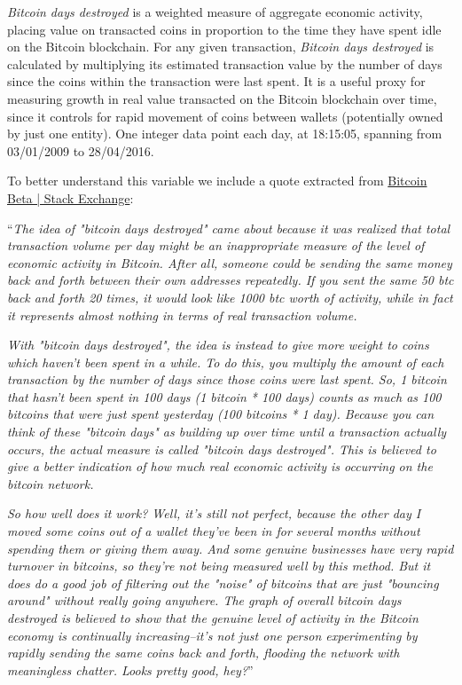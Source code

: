 \textit{Bitcoin days destroyed} is a weighted measure of aggregate
economic activity, placing value on transacted coins in proportion to
the time they have spent idle on the Bitcoin blockchain. For any given
transaction, \textit{Bitcoin days destroyed} is calculated by
multiplying its estimated transaction value by the number of days
since the coins within the transaction were last spent. It is a useful
proxy for measuring growth in real value transacted on the Bitcoin
blockchain over time, since it controls for rapid movement of coins
between wallets (potentially owned by just one entity). One integer
data point each day, at 18:15:05, spanning from 03/01/2009 to
28/04/2016.

To better understand this variable we include a quote extracted from
\href{http://bitcoin.stackexchange.com/questions/845/what-are-bitcoin-days-destroyed}{Bitcoin
Beta | Stack Exchange}:

``\textit{The idea of "bitcoin days destroyed" came about because it
was realized that total transaction volume per day might be an
inappropriate measure of the level of economic activity in Bitcoin.
After all, someone could be sending the same money back and forth
between their own addresses repeatedly. If you sent the same 50 btc
back and forth 20 times, it would look like 1000 btc worth of
activity, while in fact it represents almost nothing in terms of real
transaction volume.}

\textit{With "bitcoin days destroyed", the idea is instead to give
more weight to coins which haven't been spent in a while. To do this,
you multiply the amount of each transaction by the number of days
since those coins were last spent. So, 1 bitcoin that hasn't been
spent in 100 days (1 bitcoin * 100 days) counts as much as 100
bitcoins that were just spent yesterday (100 bitcoins * 1 day).
Because you can think of these "bitcoin days" as building up over time
until a transaction actually occurs, the actual measure is called
"bitcoin days destroyed". This is believed to give a better indication
of how much real economic activity is occurring on the bitcoin
network.}

\textit{ So how well does it work? Well, it's still not perfect,
because the other day I moved some coins out of a wallet they've been
in for several months without spending them or giving them away. And
some genuine businesses have very rapid turnover in bitcoins, so
they're not being measured well by this method. But it does do a good
job of filtering out the "noise" of bitcoins that are just "bouncing
around" without really going anywhere. The graph of overall bitcoin
days destroyed is believed to show that the genuine level of activity
in the Bitcoin economy is continually increasing--it's not just one
person experimenting by rapidly sending the same coins back and forth,
flooding the network with meaningless chatter. Looks pretty good,
hey?}''

